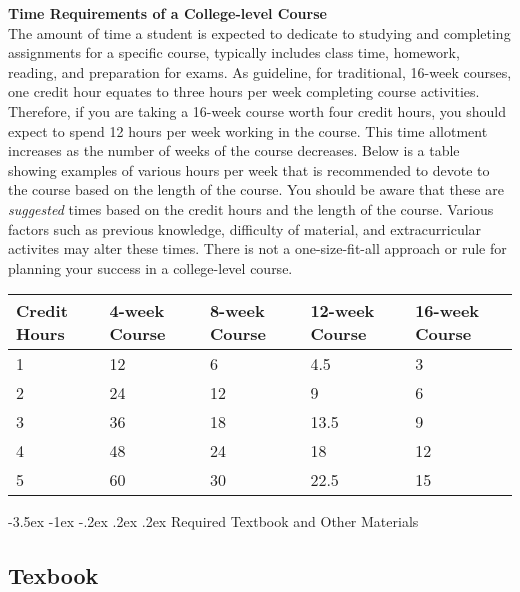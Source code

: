 \documentclass[11pt]{article}
\makeatletter
\renewcommand\section{\@startsection{section}{1}{0pt}%
  {-3.5ex \@plus -1ex \@minus -.2ex}%
  {.2ex \@plus.2ex}%
  {\normalfont\Large\bfseries}} %
\renewenvironment{framed}[1][]{%
  \def\FrameCommand{%
    \hspace{1pt}%
    {\color{mybordercolor}\vrule width 2pt} %
    \hspace{1pt}%
    \fboxsep=\FrameSep%
    \colorbox{mybgcolor}%
  }%
  \MakeFramed {\advance\hsize-\width \FrameRestore}%
}{%
  \endMakeFramed
}
\makeatother
\begin{document}
\begin{framed}
\textbf{Time Requirements of a College-level Course}\\
The amount of time a student is expected to dedicate to studying and completing assignments for a specific course, typically includes class time, homework, reading, and preparation for exams. As guideline, for traditional, 16-week courses, one credit hour equates to three hours per week completing course activities. Therefore, if you are taking a 16-week course worth four credit hours, you should expect to spend 12 hours per week working in the course. This time allotment increases as the number of weeks of the course decreases. Below is a table showing examples of various hours per week that is recommended to devote to the course based on the length of the course. You should be aware that these are \textit{suggested} times based on the credit hours and the length of the course. Various factors such as previous knowledge, difficulty of material, and extracurricular activites may alter these times. There is not a one-size-fit-all approach or rule for planning your success in a college-level course.

\bigskip\noindent
\begin{tabular}{p{}p{}p{}p{}p{}}
\toprule
Credit Hours & 4-week Course & 8-week Course & 12-week Course & 16-week Course \\
\hline
1 & 12 & 6 & 4.5 & 3 \\
2 & 24 & 12 & 9 & 6 \\
3 & 36 & 18 & 13.5 & 9 \\
4 & 48 & 24 & 18 & 12 \\
5 & 60 & 30 & 22.5 & 15 \\
\bottomrule
\end{tabular}

\bigskip
\end{framed}

\section{Required Textbook and Other Materials}

\subsection{Texbook}
\end{document}
